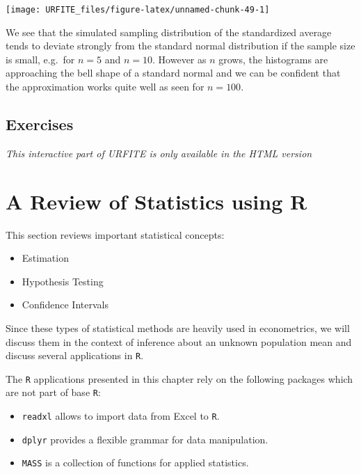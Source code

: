 \documentclass[]{book}
\theoremstyle{definition}
\theoremstyle{definition}
\theoremstyle{definition}
\theoremstyle{remark}
\begin{document}
\begin{center}\texttt{[image: URFITE\_files/figure-latex/unnamed-chunk-49-1]} \end{center}

We see that the simulated sampling distribution of the standardized
average tends to deviate strongly from the standard normal distribution
if the sample size is small, e.g.~for \(n=5\) and \(n=10\). However as
\(n\) grows, the histograms are approaching the bell shape of a standard
normal and we can be confident that the approximation works quite well
as seen for \(n=100\).

\section{Exercises}\label{exercises}

\begin{center}\textit{This interactive part of URFITE is only available in the HTML version}\end{center}

\chapter{A Review of Statistics using
R}\label{a-review-of-statistics-using-r}

This section reviews important statistical concepts:

\begin{itemize}
\item
  Estimation
\item
  Hypothesis Testing
\item
  Confidence Intervals
\end{itemize}

Since these types of statistical methods are heavily used in
econometrics, we will discuss them in the context of inference about an
unknown population mean and discuss several applications in \texttt{R}.

The \texttt{R} applications presented in this chapter rely on the
following packages which are not part of base \texttt{R}:

\begin{itemize}
\item
  \texttt{readxl} allows to import data from Excel to \texttt{R}.
\item
  \texttt{dplyr} provides a flexible grammar for data manipulation.
\item
  \texttt{MASS} is a collection of functions for applied statistics.
\end{itemize}
\end{document}
